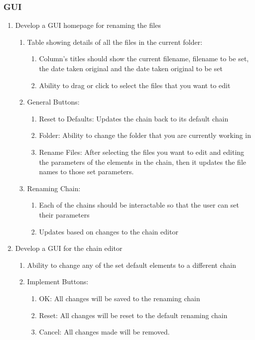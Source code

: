 \documentclass[11pt]{article}
\begin{document}
\subsubsection{GUI}
\begin{enumerate}
    \item Develop a GUI homepage for renaming the files
    \begin{enumerate}
        \item Table showing details of all the files in the current folder:
        \begin{enumerate}
            \item Column's titles should show the current filename, filename to be set, the date taken original and the date taken original to be set
            \item Ability to drag or click to select the files that you want to edit
        \end{enumerate}
        \item General Buttons:
        \begin{enumerate}
            \item Reset to Defaults: Updates the chain back to its default chain
            \item Folder: Ability to change the folder that you are currently working in
            \item Rename Files: After selecting the files you want to edit and editing the parameters of the elements in the chain, then it updates the file names to those set parameters.
        \end{enumerate}
        \item Renaming Chain:
        \begin{enumerate}
            \item Each of the chains should be interactable so that the user can set their parameters
            \item Updates based on changes to the chain editor
        \end{enumerate}
    \end{enumerate}
    \item Develop a GUI for the chain editor
    \begin{enumerate}
        \item Ability to change any of the set default elements to a different chain
        \item Implement Buttons:
        \begin{enumerate}
            \item OK: All changes will be saved to the renaming chain
            \item Reset: All changes will be reset to the default renaming chain
            \item Cancel: All changes made will be removed.
        \end{enumerate}
    \end{enumerate}
\end{enumerate}
\end{document}
